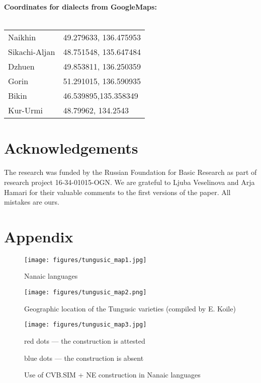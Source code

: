 \documentclass[output=paper]{langscibook}
\begin{document}
\newpage
\textbf{Coordinates for dialects from GoogleMaps:}\\
\\
\begin{tabularx}{.6\textwidth}{lQ}
    Naikhin & 49.279633, 136.475953\\
    Sikachi-Aljan & 48.751548, 135.647484\\
    Dzhuen & 49.853811, 136.250359\\
    Gorin & 51.291015, 136.590935\\
    Bikin & 46.539895,135.358349\\
    Kur-Urmi & 48.79962, 134.2543\\
\end{tabularx}

\section*{Acknowledgements}
The research was funded by the Russian Foundation for Basic Research as part of research project 16-34-01015-OGN. We are grateful to Ljuba Veselinova and Arja Hamari for their valuable comments to the first versions of the paper. All mistakes are ours.

\pagebreak
\newpage
\section*{Appendix}

\begin{figure}[!h]
    \captionsetup{name=Map}
    \texttt{[image: figures/tungusic\_map1.jpg]}
    \caption{Nanaic languages}
    \label{fig:T1}
\end{figure}

\pagebreak
\newpage
\begin{figure}[!h]
    \captionsetup{name=Map}
    \texttt{[image: figures/tungusic\_map2.png]}
    \caption{Geographic location of the Tungusic varieties (compiled by E. Koile)}
    \label{fig:T2}
\end{figure}

\pagebreak
\newpage
\begin{figure}[!h]
    \captionsetup{name=Map}
    \texttt{[image: figures/tungusic\_map3.jpg]}
    \caption{Use of CVB.SIM + NE construction in Nanaic languages}
    \label{fig:T3}

    red dots — the construction is attested

    blue dots — the construction is absent

\end{figure}
\end{document}

